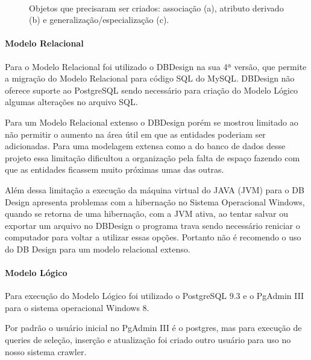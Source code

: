 \documentclass[12pt]{article}
\begin{document}
\begin{figure}[H]
\centering
\mbox{\quad
{}}
\caption{Objetos que precisaram ser criados: associação (a), atributo derivado (b) e generalização/especialização (c).}
\label{fig6}
\end{figure}

\paragraph{Modelo Relacional\newline}

Para o Modelo Relacional foi utilizado o DBDesign na sua 4ª versão, que permite a migração do Modelo Relacional para código SQL do MySQL. DBDesign não oferece suporte ao PostgreSQL sendo necessário para criação do Modelo Lógico algumas alterações no arquivo SQL. 

Para um Modelo Relacional extenso o DBDesign porém se mostrou limitado ao não permitir o aumento na área útil em que as entidades poderiam ser adicionadas. Para uma modelagem extensa como a do banco de dados desse projeto essa limitação dificultou a organização pela falta de espaço fazendo com que as entidades ficassem muito próximas umas das outras. 

Além dessa limitação a execução da máquina virtual do JAVA (JVM) para o DB Design apresenta problemas com a hibernação no Sistema Operacional Windows, quando se retorna de uma hibernação, com a JVM ativa, ao tentar salvar ou exportar um arquivo no DBDesign o programa trava sendo necessário reniciar o computador para voltar a utilizar essas opções. Portanto não é recomendo o uso do DB Design para um modelo relacional extenso. 

\paragraph{Modelo Lógico\newline}

Para execução do Modelo Lógico foi utilizado o PostgreSQL 9.3 e o PgAdmin III para o sistema operacional Windows 8. 

Por padrão o usuário inicial no PgAdmin III é o postgres, mas para execução de queries de seleção, inserção e atualização foi criado outro usuário para uso no nosso sistema crawler. 
\end{document}
